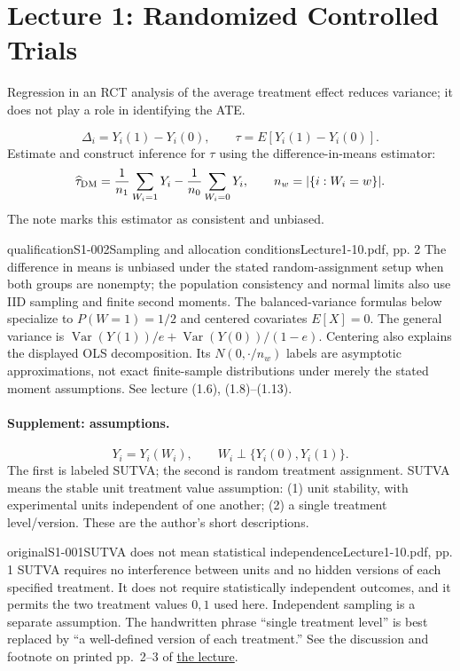 \section{Lecture 1: Randomized Controlled Trials}
Regression in an RCT analysis of the average treatment effect reduces variance; it does not play a role in identifying the ATE.

\[
\Delta_i=Y_i(1)-Y_i(0),\qquad \tau=E[Y_i(1)-Y_i(0)].
\]
Estimate and construct inference for $\tau$ using the difference-in-means estimator:
\[
\widehat\tau_{\rm DM}=\frac1{n_1}\sum_{W_i=1}Y_i-\frac1{n_0}\sum_{W_i=0}Y_i,
\qquad n_w=|\{i:W_i=w\}|.
\]
The note marks this estimator as consistent and unbiased.

\begin{reviewnote}{qualification}{S1-002}{Sampling and allocation conditions}{Lecture1-10.pdf, pp. 2}
The difference in means is unbiased under the stated random-assignment setup when both groups are nonempty; the population consistency and normal limits also use IID sampling and finite second moments. The balanced-variance formulas below specialize to $P(W=1)=1/2$ and centered covariates $E[X]=0$. The general variance is $\operatorname{Var}(Y(1))/e+\operatorname{Var}(Y(0))/(1-e)$. Centering also explains the displayed OLS decomposition. Its $N(0,\cdot/n_w)$ labels are asymptotic approximations, not exact finite-sample distributions under merely the stated moment assumptions. See lecture (1.6), (1.8)--(1.13).
\end{reviewnote}

\paragraph{Supplement: assumptions.}
\[
Y_i=Y_i(W_i),\qquad W_i\perp\{Y_i(0),Y_i(1)\}.
\]
The first is labeled SUTVA; the second is random treatment assignment. SUTVA means the stable unit treatment value assumption: (1) unit stability, with experimental units independent of one another; (2) a single treatment level/version. These are the author's short descriptions.

\begin{reviewnote}{original}{S1-001}{SUTVA does not mean statistical independence}{Lecture1-10.pdf, pp. 1}
SUTVA requires no interference between units and no hidden versions of each specified treatment. It does not require statistically independent outcomes, and it permits the two treatment values $0,1$ used here. Independent sampling is a separate assumption. The handwritten phrase ``single treatment level'' is best replaced by ``a well-defined version of each treatment.'' See the discussion and footnote on printed pp.~2--3 of \href{https://web.stanford.edu/~swager/stats361.pdf}{the lecture}.
\end{reviewnote}

